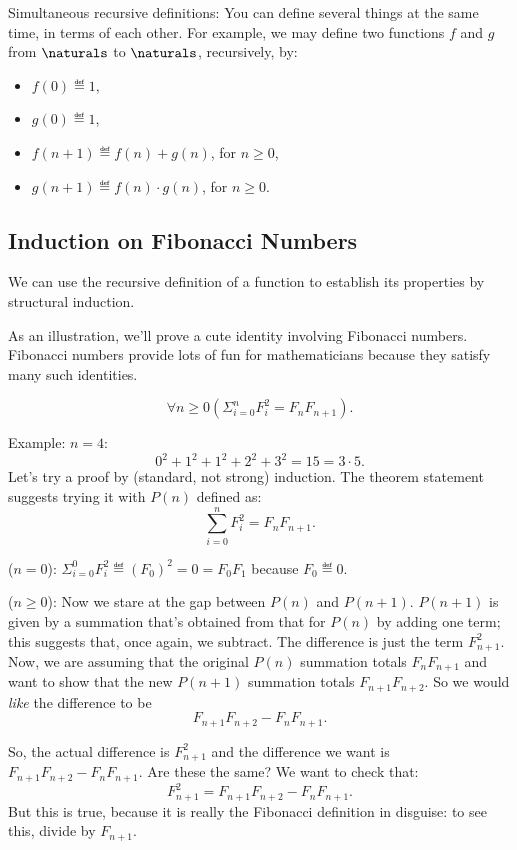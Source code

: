 \begin{editingnotes}

\item[Simultaneous recursive definitions:]
  You can define several things at the same time, in terms of each
  other.  For example, we may define two functions $f$ and $g$ from
  $\naturals$ to $\naturals$, recursively, by:
  \begin{itemize}
  \item
    $f(0) \eqdef 1$,
  \item
    $g(0) \eqdef 1$,
  \item
    $f(n+1) \eqdef f(n) + g(n)$, for $n \geq 0$,
  \item
    $g(n+1) \eqdef f(n) \cdot g(n)$, for $n \geq 0$.
  \end{itemize}

\end{editingnotes}


\begin{editingnotes}

\subsection{Induction on Fibonacci Numbers}

We can use the recursive definition of a function to establish its
properties by structural induction.

As an illustration, we'll prove a cute identity involving Fibonacci
numbers.  Fibonacci numbers provide lots of fun for mathematicians because
they satisfy many such identities.
\begin{proposition}
\[
\forall n \geq 0 (\Sigma_{i=0}^n F_i^2 = F_n F_{n+1}).
\]
\end{proposition}

Example: $n = 4$:
\[
0^2 + 1^2 + 1^2 + 2^2 + 3^2 = 15 = 3 \cdot 5.
\]
Let's try a proof by (standard, not strong) induction.  The theorem
statement suggests trying it with $P(n)$ defined as:
\[
\sum_{i=0}^n F_i^2 = F_n F_{n+1}.
\]

 ($n=0$):
$\Sigma_{i=0}^0 F_i^2 \eqdef (F_0)^2 = 0 = F_0 F_1$ because
$F_0 \eqdef 0$.

 ($n\geq 0$): Now we stare at the gap
between $P(n)$ and $P(n+1)$.  $P(n+1)$ is given by a summation that's
obtained from that for $P(n)$ by adding one term; this suggests that,
once again, we subtract.  The difference is just the term $F_{n+1}^2$.
Now, we are assuming that the original $P(n)$ summation totals $F_n
F_{n+1}$ and want to show that the new $P(n+1)$ summation totals
$F_{n+1} F_{n+2}$.  So we would \emph{like} the difference to be
\[
F_{n+1} F_{n+2} - F_n F_{n+1}.
\]

So, the actual difference is $F_{n+1}^2$ and the difference we want is
$F_{n+1} F_{n+2} - F_n F_{n+1}$.  Are these the same?  We want to check
that:
\[
F_{n+1}^2 = F_{n+1} F_{n+2} - F_n F_{n+1}.
\]
But this is true, because it is really the Fibonacci definition in
disguise: to see this, divide by $F_{n+1}$.

\end{editingnotes}

